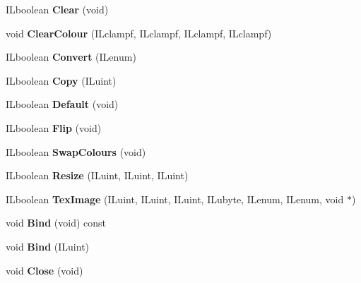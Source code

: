 \begin{DoxyCompactItemize}
\mbox{\label{classilImage_a202758160e65bda0a4135e133cd87112}} 
I\+Lboolean {\bfseries Clear} (void)
\item 
\mbox{\label{classilImage_a6af139983b79f6c0c11ddc0b6870fe02}} 
void {\bfseries Clear\+Colour} (I\+Lclampf, I\+Lclampf, I\+Lclampf, I\+Lclampf)
\item 
\mbox{\label{classilImage_a6b0991b943109549e874ae3a5c161ee6}} 
I\+Lboolean {\bfseries Convert} (I\+Lenum)
\item 
\mbox{\label{classilImage_a0cb50014832fdb0ac45a345804c8da50}} 
I\+Lboolean {\bfseries Copy} (I\+Luint)
\item 
\mbox{\label{classilImage_a981280302a80e0d2e68d1229cb70c60f}} 
I\+Lboolean {\bfseries Default} (void)
\item 
\mbox{\label{classilImage_a83331e94a466f7d3e55975928d476711}} 
I\+Lboolean {\bfseries Flip} (void)
\item 
\mbox{\label{classilImage_a470e3a5cc20ec88017d216b1af497f9e}} 
I\+Lboolean {\bfseries Swap\+Colours} (void)
\item 
\mbox{\label{classilImage_aeefe83c3a39c37600868c29d4afb8294}} 
I\+Lboolean {\bfseries Resize} (I\+Luint, I\+Luint, I\+Luint)
\item 
\mbox{\label{classilImage_aaaaf3d4cc345ede46bd1f93a766d1d75}} 
I\+Lboolean {\bfseries Tex\+Image} (I\+Luint, I\+Luint, I\+Luint, I\+Lubyte, I\+Lenum, I\+Lenum, void $\ast$)
\item 
\mbox{\label{classilImage_a70961de55313a9fdd48b2af2d286f8a5}} 
void {\bfseries Bind} (void) const
\item 
\mbox{\label{classilImage_a05bb0ec4ac2f28f9cdc6c7cc2403691e}} 
void {\bfseries Bind} (I\+Luint)
\item 
\mbox{\label{classilImage_a2b08b24ceb9e1c38ad45cecb7a967fee}} 
void {\bfseries Close} (void)
\item 

\end{DoxyCompactItemize}
